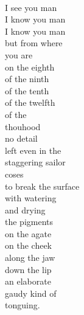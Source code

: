 \documentclass[smalldemyvopaper,11pt,twoside,onecolumn,openright,extrafontsizes]{memoir}
\begin{document}
\\I see you man
\\I know you man
\\I know you man
\\but from where
\\you are
\\on the eighth
\\of the ninth
\\of the tenth
\\of the twelfth
\\of the
\\thouhood
\\no detail
\\left even in the
\\staggering sailor
\\coses
\\to break the surface
\\with watering
\\and drying
\\the pigments
\\on the agate
\\on the cheek
\\along the jaw
\\down the lip
\\an elaborate
\\gaudy kind of
\\tonguing.
\end{document}
